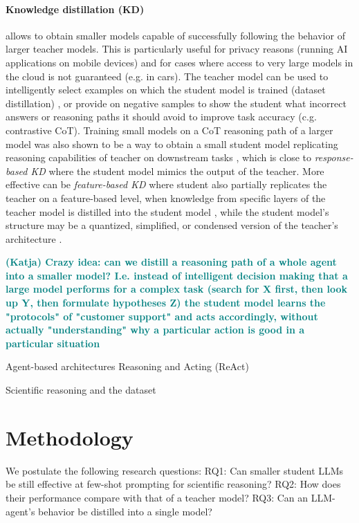 \documentclass[10pt]{article}
\newcommand{\katja}[1]{\textbf{\textcolor{teal}{(Katja) #1}}}
\begin{document}
\paragraph{Knowledge distillation (KD)} allows to obtain smaller models capable of successfully following the behavior of larger teacher models. This is particularly useful for privacy reasons (running AI applications on mobile devices) and for cases where access to very large models in the cloud is not guaranteed (e.g. in cars). The teacher model can be used to intelligently select examples on which the student model is trained (dataset distillation) \cite{yu2023dataset}, or provide on negative samples to show the student what incorrect answers or reasoning paths it should avoid to improve task accuracy  \cite{li2024turning} (c.g. contrastive CoT). Training small models on a CoT reasoning path of a larger model was also shown to be a way to obtain a small student model replicating reasoning capabilities of teacher on downstream tasks \cite{magister2022teaching}, which is close to \textit{response-based KD} where the student model mimics the output of the teacher. More effective can be \textit{feature-based KD} where student also partially replicates the teacher on a feature-based level, when knowledge from specific layers of the teacher model is distilled into the student model \cite{sepahvand2022teacher}, while the student model's structure may be a quantized, simplified, or condensed version of the teacher's architecture \cite{gou2021knowledge}. 

\katja{Crazy idea: can we distill a reasoning path of a whole agent into a smaller model? I.e. instead of intelligent decision making that a large model performs for a complex task (search for X first, then look up Y, then formulate hypotheses Z) the student model learns the "protocols" of "customer support" and acts accordingly, without actually "understanding" why a particular action is good in a particular situation}

Agent-based architectures \cite{lin2024swiftsage} \cite{ghafarollahi2024sciagents}
Reasoning and Acting (ReAct) 

Scientific reasoning and the dataset \cite{lu2022learn}

\section{Methodology}
We postulate the following research questions: 
RQ1: Can smaller student LLMs be still effective at few-shot prompting for scientific reasoning?
RQ2: How does their performance compare with that of a teacher model?
RQ3: Can an LLM-agent's behavior be distilled into a single model?
\end{document}
